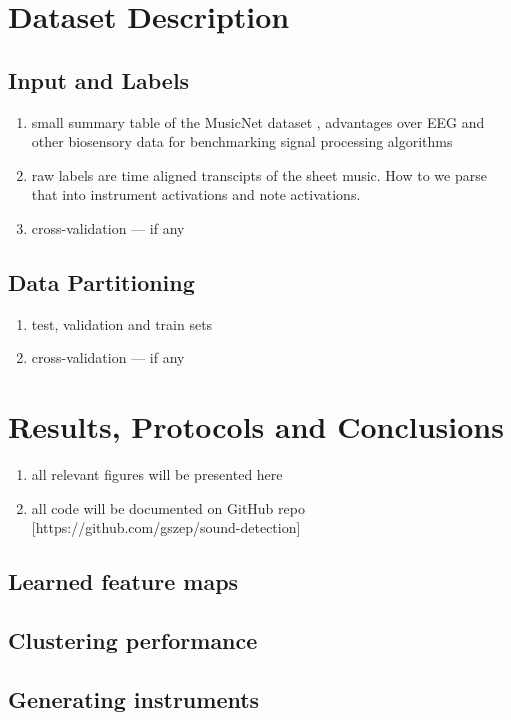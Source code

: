 \documentclass{article}[12pt]
\numberwithin{equation}{section}
\begin{document}
\section{Dataset Description}

\subsection{Input and Labels}
\begin{enumerate}
	\item small summary table of the MusicNet dataset \cite{Thickstun2016}, advantages
	over EEG and other biosensory data for benchmarking signal processing algorithms
	\item raw labels are time aligned transcipts of the sheet music. How to we
	parse that into instrument activations and note activations.
	\item cross-validation --- if any
\end{enumerate}

\subsection{Data Partitioning}
\begin{enumerate}
	\item test, validation and train sets
	\item cross-validation --- if any
\end{enumerate}

\section{Results, Protocols and Conclusions}
\begin{enumerate}
	\item all relevant figures will be presented here
	\item all code will be documented on GitHub repo [https://github.com/gszep/sound-detection]
\end{enumerate}
\subsection{Learned feature maps}

\subsection{Clustering performance}

\subsection{Generating instruments}



\end{document}
